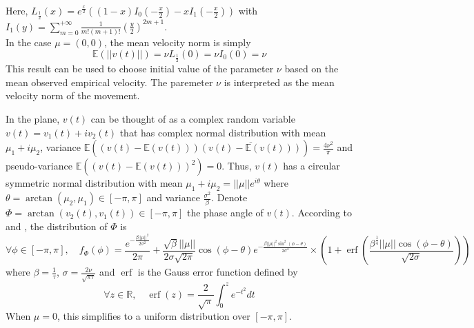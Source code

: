 \documentclass[11pt]{article}
\DeclareMathOperator{\erf}{erf}
\newcommand {\R}{\mathbb{R}}
\newcommand {\E}{\mathbb{E}}
\newcommand {\1}{\mathbb{1}}
\theoremstyle{definition}
\theoremstyle{remark}
\theoremstyle{remark}
\begin{document}
Here, $L_{\frac{1}{2}}(x)=e^{\frac{x}{2}} \left( (1-x) I_0\left( -\frac{x}{2}\right)-xI_1\left( -\frac{x}{2}\right)\right)$ with $I_1(y)=\sum_{m=0}^{+\infty} \frac{1}{m!(m+1)!}\left(\frac{y}{2}\right)^{2m+1}$.\\

In the case $\mu=(0,0)$, the mean velocity norm is simply 
\[\E(\vert \vert v(t) \vert \vert)=\nu L_{\frac{1}{2}}(0)=\nu I_{0}(0)=\nu\]
This result can be used to choose initial value of the parameter $\nu$ based on the mean observed empirical velocity. The paremeter $\nu$ is interpreted as the mean velocity norm of the movement.

In the plane, $v(t)$ can be thought of as a complex random variable $v(t)=v_1(t)+iv_2(t)$ that has complex normal distribution with mean $\mu_1+i\mu_2$, variance $\E\left((v(t)-\E(v(t)))\overline{(v(t)-\E(v(t)))}\right)=\frac{4\nu^
	2}{\pi}$ and pseudo-variance $\E\left((v(t)-\E(v(t)))^2\right)=0$. Thus, $v(t)$ has a circular symmetric normal distribution with mean $\mu_1+i\mu_2=\vert \vert \mu \vert \vert e^{i\theta}$ where $\theta=\arctan(\mu_2,\mu_1) \in [-\pi, \pi]$ and variance $\frac{\sigma^2}{\beta}$.
Denote $\Phi=\arctan(v_2(t),v_1(t)) \in [-\pi, \pi]$ the phase angle of $v(t)$.
According to \cite{letzepis_von_2015} and \cite{pawula_distribution_1982}, the distribution of $\Phi$ is 
\[\forall \phi \in [-\pi,\pi], \quad f_{\Phi}(\phi)=\frac{e^{-\frac{\beta \vert \vert \mu \vert \vert^2}{2\sigma^2}}}{2\pi} +\frac{\sqrt{\beta} \vert \vert \mu \vert \vert}{2\sigma\sqrt{2\pi}} \cos(\phi-\theta)e^{-\frac{\beta\vert \vert \mu \vert \vert^2 \sin^2(\phi-\theta)}{2\sigma^2}} \times \left(1+\erf\left(\frac{\beta^{\frac{1}{4}}\vert \vert \mu \vert \vert \cos(\phi-\theta)}{\sqrt{2\sigma}}\right)\right)\]
where $\beta=\frac{1}{\tau}$, $\sigma=\frac{2\nu}{\sqrt{\pi \tau}}$ and $\erf$ is the Gauss error function defined by 
\[\forall z \in \R, \quad \erf(z)=\frac{2}{\sqrt{\pi}} \int_0^z e^{-t^2} dt\]
When $\mu=0$, this simplifies to a uniform distribution over $[-\pi,\pi]$.\\
\end{document}
